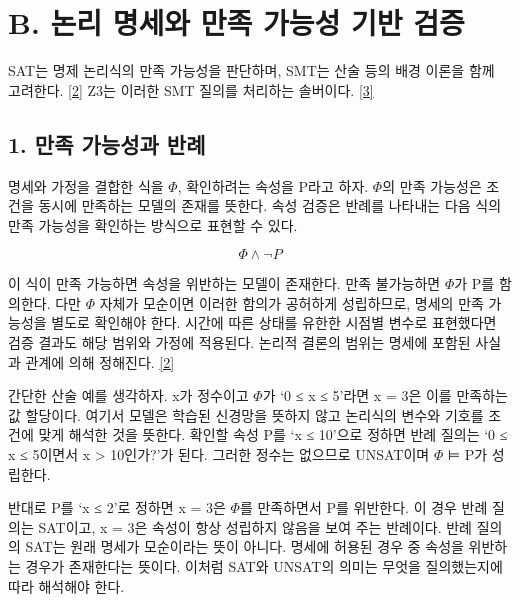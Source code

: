 \documentclass[11pt,a4paper]{article}
\begin{document}
\section*{B. 논리 명세와 만족 가능성 기반 검증}

SAT는 명제 논리식의 만족 가능성을 판단하며, SMT는 산술 등의 배경 이론을 함께 고려한다. \href{\detokenize{https://theory.stanford.edu/~barrett/pubs/BT18.pdf}}{[2]} Z3는 이러한 SMT 질의를 처리하는 솔버이다. \href{\detokenize{https://doi.org/10.1007/978-3-540-78800-3_24}}{[3]}\par

\subsection*{1. 만족 가능성과 반례}

명세와 가정을 결합한 식을 \ensuremath{\Phi}, 확인하려는 속성을 P라고 하자. \ensuremath{\Phi}의 만족 가능성은 조건을 동시에 만족하는 모델의 존재를 뜻한다. 속성 검증은 반례를 나타내는 다음 식의 만족 가능성을 확인하는 방식으로 표현할 수 있다.\par

\[\Phi \land \neg P\]

이 식이 만족 가능하면 속성을 위반하는 모델이 존재한다. 만족 불가능하면 \ensuremath{\Phi}가 P를 함의한다. 다만 \ensuremath{\Phi} 자체가 모순이면 이러한 함의가 공허하게 성립하므로, 명세의 만족 가능성을 별도로 확인해야 한다. 시간에 따른 상태를 유한한 시점별 변수로 표현했다면 검증 결과도 해당 범위와 가정에 적용된다. 논리적 결론의 범위는 명세에 포함된 사실과 관계에 의해 정해진다. \href{\detokenize{https://theory.stanford.edu/~barrett/pubs/BT18.pdf}}{[2]}\par

간단한 산술 예를 생각하자. x가 정수이고 \ensuremath{\Phi}가 ‘0 ≤ x ≤ 5’라면 x = 3은 이를 만족하는 값 할당이다. 여기서 모델은 학습된 신경망을 뜻하지 않고 논리식의 변수와 기호를 조건에 맞게 해석한 것을 뜻한다. 확인할 속성 P를 ‘x ≤ 10’으로 정하면 반례 질의는 ‘0 ≤ x ≤ 5이면서 x > 10인가?’가 된다. 그러한 정수는 없으므로 UNSAT이며 \ensuremath{\Phi} ⊨ P가 성립한다.\par

반대로 P를 ‘x ≤ 2’로 정하면 x = 3은 \ensuremath{\Phi}를 만족하면서 P를 위반한다. 이 경우 반례 질의는 SAT이고, x = 3은 속성이 항상 성립하지 않음을 보여 주는 반례이다. 반례 질의의 SAT는 원래 명세가 모순이라는 뜻이 아니다. 명세에 허용된 경우 중 속성을 위반하는 경우가 존재한다는 뜻이다. 이처럼 SAT와 UNSAT의 의미는 무엇을 질의했는지에 따라 해석해야 한다.\par
\end{document}

